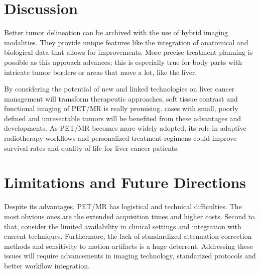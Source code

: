 \documentclass[11pt]{article} %
\begin{document}
\begin{multicols}{2}
\section{Discussion}

Better tumor delineation can be archived with the use of hybrid imaging modalities. They provide unique features like the integration of anatomical and biological data that allows for improvements. More precise treatment planning is possible as this approach advances; this is especially true for body parts with intricate tumor borders or areas that move a lot, like the liver.



By considering the potential of new and linked technologies on liver cancer management will transform therapeutic approaches, soft tissue contrast and functional imaging of PET/MR is really promising. cases with small, poorly defined and unresectable tumors will be benefited from these advantages and developments. As PET/MR becomes more widely adopted, its role in adaptive radiotherapy workflows and personalized treatment regimens could improve survival rates and quality of life for liver cancer patients.

\section{Limitations and Future Directions}


Despite its advantages, PET/MR has logistical and technical difficulties. The most obvious ones are the extended acquisition times and higher costs. Second to that, consider the limited availability in clinical settings and integration with current techniques. Furthermore, the lack of standardized attenuation correction methods and sensitivity to motion artifacts is a huge deterrent. Addressing these issues will require advancements in imaging technology, standarized protocols and better workflow integration.\cite{pichler2008,Prakken2023}


\end{multicols}
\end{document}

